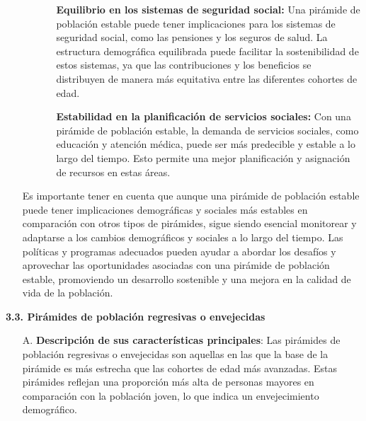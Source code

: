\documentclass[8pt,a4paper]{beamer}
\begin{document}
{\begin{frame}{}
\begin{block}{}
\justifying
\begin{enumerate}
\justifying
\item[{}] 
\begin{enumerate}
\justifying
\item[{}]
\begin{itemize}
\justifying
\item[\ding{65}] \textbf{Equilibrio en los sistemas de seguridad social:} Una pirámide de población estable puede tener implicaciones para los sistemas de seguridad social, como las pensiones y los seguros de salud. La estructura demográfica equilibrada puede facilitar la sostenibilidad de estos sistemas, ya que las contribuciones y los beneficios se distribuyen de manera más equitativa entre las diferentes cohortes de edad.

\item[\ding{65}] \textbf{Estabilidad en la planificación de servicios sociales:} Con una pirámide de población estable, la demanda de servicios sociales, como educación y atención médica, puede ser más predecible y estable a lo largo del tiempo. Esto permite una mejor planificación y asignación de recursos en estas áreas.
\end{itemize}
\end{enumerate}
Es importante tener en cuenta que aunque una pirámide de población estable puede tener implicaciones demográficas y sociales más estables en comparación con otros tipos de pirámides, sigue siendo esencial monitorear y adaptarse a los cambios demográficos y sociales a lo largo del tiempo. Las políticas y programas adecuados pueden ayudar a abordar los desafíos y aprovechar las oportunidades asociadas con una pirámide de población estable, promoviendo un desarrollo sostenible y una mejora en la calidad de vida de la población.
\end{enumerate}
\end{block}
\end{frame}


\begin{frame}{}
\begin{block}{\textbf{3.3. Pirámides de población regresivas o envejecidas}}
\justifying
\begin{enumerate}
\justifying
\item[A.] \textbf{Descripción de sus características principales}: Las pirámides de población regresivas o envejecidas son aquellas en las que la base de la pirámide es más estrecha que las cohortes de edad más avanzadas. Estas pirámides reflejan una proporción más alta de personas mayores en comparación con la población joven, lo que indica un envejecimiento demográfico.


\end{enumerate}
\end{block}
\end{frame}}
\end{document}

